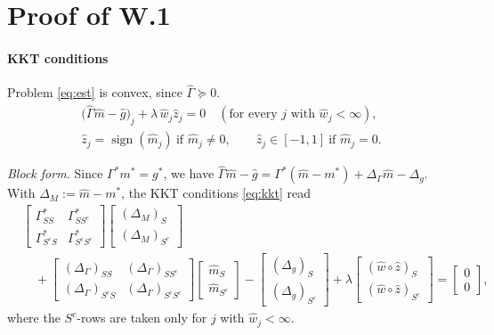 \documentclass[11pt,a4paper]{article}
\numberwithin{equation}{section}
\theoremstyle{plain}
\theoremstyle{remark}
\DeclareMathOperator{\sign}{sign}
\begin{document}
\section{Proof of W.1}\label{sec:proof}

\paragraph{KKT conditions} Problem \eqref{eq:est} is convex, since $\hat\Gamma\succeq0$.
\begin{equation}\label{eq:kkt}
\begin{gathered}
\big(\hat\Gamma\hat m-\hat g\big)_j+\lambda\,\hat w_j\hat z_j=0\quad(\text{for every $j$ with $\hat{w}_j < \infty$}),\\
\hat z_j=\sign(\hat m_j)\ \text{if }\hat m_j\ne0,\qquad \hat z_j\in[-1,1]\ \text{if }\hat m_j=0 .
\end{gathered}
\end{equation}

\emph{Block form.} Since $\Gamma^*m^*=g^*$, we have $\hat\Gamma\hat m-\hat g=\Gamma^*(\hat m-m^*)+\Delta_\Gamma\hat m-\Delta_g$. With $\Delta_M:=\hat m-m^*$, the KKT conditions \eqref{eq:kkt} read
\begin{align*}
&\begin{bmatrix}\Gamma^*_{SS}&\Gamma^*_{SS^c}\\\Gamma^*_{S^cS}&\Gamma^*_{S^cS^c}\end{bmatrix}
\begin{bmatrix}(\Delta_M)_S\\(\Delta_M)_{S^c}\end{bmatrix}\\
&\quad+\begin{bmatrix}(\Delta_\Gamma)_{SS}&(\Delta_\Gamma)_{SS^c}\\(\Delta_\Gamma)_{S^cS}&(\Delta_\Gamma)_{S^cS^c}\end{bmatrix}
\begin{bmatrix}\hat m_S\\\hat m_{S^c}\end{bmatrix}
-\begin{bmatrix}(\Delta_g)_S\\(\Delta_g)_{S^c}\end{bmatrix}
+\lambda\begin{bmatrix}(\hat w\circ\hat z)_S\\(\hat w\circ\hat z)_{S^c}\end{bmatrix}
=\begin{bmatrix}0\\0\end{bmatrix},
\end{align*}
where the $S^c$-rows are taken only for $j$ with $\hat w_j<\infty$.
\end{document}
